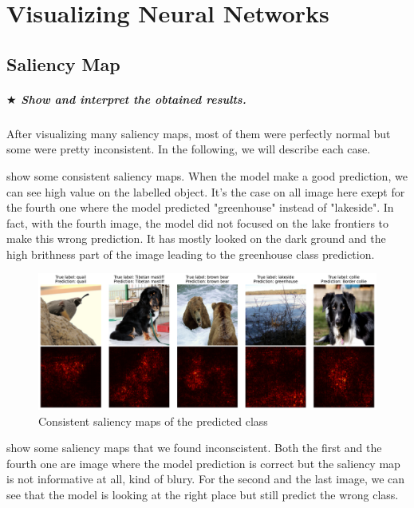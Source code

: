 \chapter{Visualizing Neural Networks}


\section{Saliency Map}
\paragraph*{$ \bigstar $ Show and interpret the obtained results.}
After visualizing many saliency maps, most of them were perfectly normal but some were pretty inconsistent. In the following, we will describe each case.


 show some consistent saliency maps. When the model make a good prediction, we can see high value on the labelled object. It's the case on all image here exept for the fourth one where the model predicted "greenhouse" instead of "lakeside". In fact, with the fourth image, the model did not focused on the lake frontiers to make this wrong prediction. It has mostly looked on the dark ground and the high brithness part of the image leading to the greenhouse class prediction.
\begin{figure}[H]
    \centering
    \includegraphics[width=.95\textwidth]{figs/2b/good_saliency_map.pdf}
    \caption{Consistent saliency maps of the predicted class}
    \label{fig:good_saliency_map}
\end{figure}


 show some saliency maps that we found inconscistent. Both the first and the fourth one are image where the model prediction is correct but the saliency map is not informative at all, kind of blury. For the second and the last image, we can see that the model is looking at the right place but still predict the wrong class.

